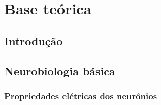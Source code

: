 \chapter{Base teórica}\label{cap:teoria}
\section{Introdução}\label{sec:teoria_intro}

\section{Neurobiologia básica}\label{sec:fisiologia}
\subsection{Propriedades elétricas dos neurônios}

